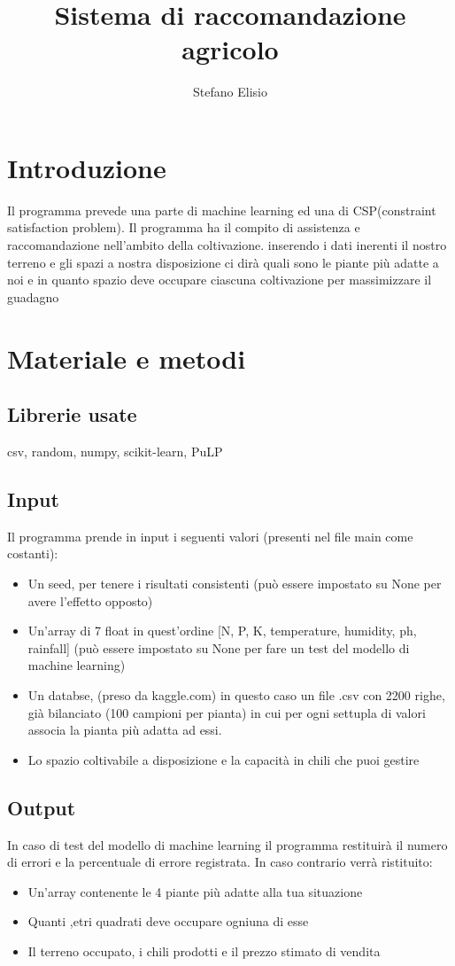 \documentclass[11pt]{article}
\title{Sistema di raccomandazione agricolo}
\author{Stefano Elisio}
\begin{document}
\maketitle
\tableofcontents

\section{Introduzione}
Il programma prevede una parte di machine learning ed una di CSP(constraint satisfaction problem).  Il programma ha il compito di assistenza e raccomandazione nell'ambito della coltivazione. inserendo i dati inerenti il nostro terreno e gli spazi a nostra disposizione ci dirà quali sono le piante più adatte a noi e in quanto spazio deve occupare ciascuna coltivazione per massimizzare il guadagno

\section{Materiale e metodi}
\subsection{Librerie usate}
csv, random, numpy, scikit-learn, PuLP

\subsection{Input}
 Il programma prende in input i seguenti valori (presenti nel file main come costanti):
\begin{itemize}
\item Un seed, per tenere i risultati consistenti (può essere impostato su None per avere l'effetto opposto)
\item Un'array di 7 float in quest'ordine [N, P, K, temperature, humidity, ph, rainfall] (può essere impostato su None per fare un test del modello di machine learning)
\item  Un databse, (preso da kaggle.com) in questo caso un file .csv con 2200 righe, già bilanciato (100 campioni per pianta) in cui per ogni settupla di valori associa la pianta più adatta ad essi.
\item Lo  spazio coltivabile a disposizione e la capacità in chili che puoi gestire
\end{itemize}

\subsection{Output}
In caso di test del modello di machine learning il programma restituirà il numero di errori e la percentuale di errore registrata.
In caso contrario verrà ristituito:
\begin{itemize}
\item Un'array contenente le 4 piante più adatte alla tua situazione
\item Quanti ,etri quadrati deve occupare ogniuna di esse
\item  Il terreno occupato, i chili prodotti e il prezzo stimato di vendita  
\end{itemize}
\end{document}
